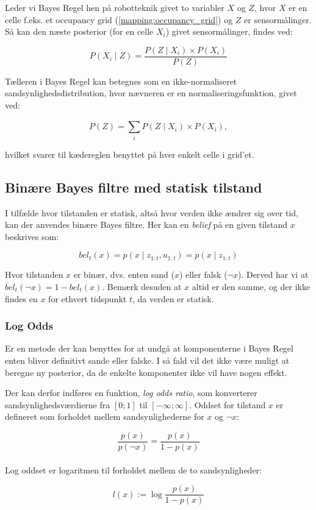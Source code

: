 Leder vi Bayes Regel hen på robotteknik givet to variabler $X$ og $Z$, hvor $X$ er en celle f.eks. et occupancy grid (\cref{mapping:occupancy_grid}) og $Z$ er sensormålinger.
Så kan den næste posterior (for en celle $X_i$) givet sensormålinger, findes ved:

$$P(X_i \mid Z) = \frac{P(Z \mid X_i) \times P(X_i)}{P(Z)}$$

Tælleren i Bayes Regel kan betegnes som en ikke-normaliseret sandsynlighedsdistribution, hvor nævneren er en normaliseringsfunktion, givet ved:

$$P(Z) = \sum_{i}^{} P(Z \mid X_i) \times P(X_i),$$

hvilket svarer til kædereglen benyttet på hver enkelt celle i grid'et.


\subsection{Binære Bayes filtre med statisk tilstand}\label{bayes_binaerfiltre}
I tilfælde hvor tilstanden er statisk, altså hvor verden ikke ændrer sig over tid, kan der anvendes binære Bayes filtre.
Her kan en \textit{belief} på en given tilstand $x$ beskrives som:

$$bel_t(x) = p(x \mid z_{1:t},u_{1:t}) = p(x \mid z_{1:t})$$

Hvor tilstanden $x$ er binær, dvs. enten sand ($x$) eller falsk ($\lnot x$).
Derved har vi at $bel_t(\lnot x) = 1 - bel_t(x)$.
Bemærk desuden at $x$ altid er den samme, og der ikke findes en $x$ for ethvert tidspunkt $t$, da verden er statisk.

\subsubsection{Log Odds}
Er en metode der kan benyttes for at undgå at komponenterne i Bayes Regel enten bliver definitivt sande eller falske.
I så fald vil det ikke være muligt at beregne ny posterior, da de enkelte komponenter ikke vil have nogen effekt.

Der kan derfor indføres en funktion, \textit{log odds ratio}, som konverterer sandsynlighedsværdierne fra $[0;1]$ til $[-\infty;\infty]$.
Oddset for tilstand $x$ er defineret som forholdet mellem sandsynlighederne for $x$ og $\lnot x$:

$$\frac{p(x)}{p(\lnot x)} = \frac{p(x)}{1 - p(x)}$$
\\
Log oddset er logaritmen til forholdet mellem de to sandsynligheder:

$$l(x) := \log \frac{p(x)}{1 - p(x)}$$


